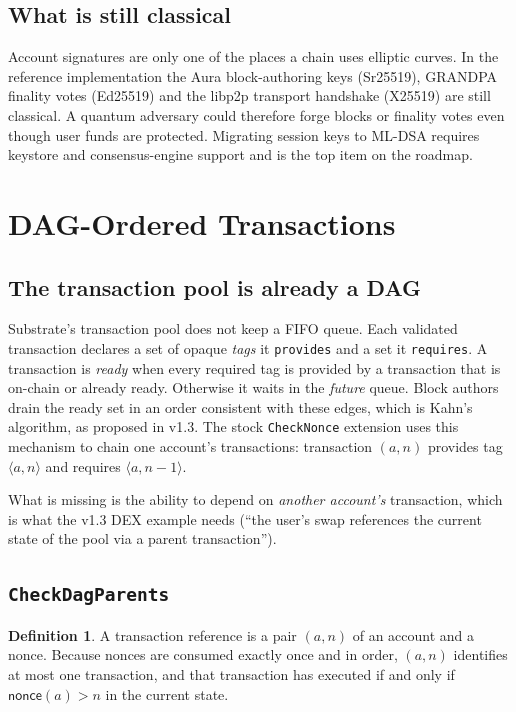 \documentclass[11pt]{article}
\theoremstyle{definition}
\newtheorem{definition}{Definition}
\theoremstyle{remark}
\begin{document}
\subsection{What is still classical}
Account signatures are only one of the places a chain uses elliptic curves. In the reference
implementation the Aura block-authoring keys (Sr25519), GRANDPA finality votes (Ed25519) and the
libp2p transport handshake (X25519) are still classical. A quantum adversary could therefore forge
blocks or finality votes even though user funds are protected. Migrating session keys to ML-DSA
requires keystore and consensus-engine support and is the top item on the roadmap.

\section{DAG-Ordered Transactions}
\label{sec:dag}

\subsection{The transaction pool is already a DAG}

Substrate's transaction pool does not keep a FIFO queue. Each validated transaction declares a set
of opaque \emph{tags} it \texttt{provides} and a set it \texttt{requires}. A transaction is
\emph{ready} when every required tag is provided by a transaction that is on-chain or already
ready. Otherwise it waits in the \emph{future} queue. Block authors drain the ready set in an order
consistent with these edges, which is Kahn's algorithm, as proposed in v1.3. The stock
\texttt{CheckNonce} extension uses this mechanism to chain one account's transactions: transaction
$(a, n)$ provides tag $\langle a, n\rangle$ and requires $\langle a, n-1\rangle$.

What is missing is the ability to depend on \emph{another account's} transaction, which is what
the v1.3 DEX example needs (``the user's swap references the current state of the pool via a parent
transaction'').

\subsection{\texttt{CheckDagParents}}

\begin{definition}
A transaction reference is a pair $(a, n)$ of an account and a nonce. Because nonces are consumed
exactly once and in order, $(a, n)$ identifies at most one transaction, and that transaction has
executed if and only if $\mathsf{nonce}(a) > n$ in the current state.
\end{definition}
\end{document}
